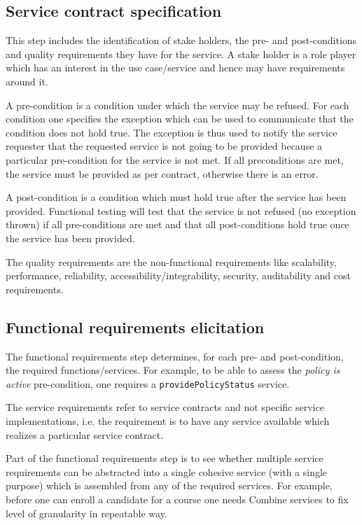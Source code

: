 \subsection{Service contract specification}
This step includes the identification of stake holders, the pre- and post-conditions and quality requirements they have for the service. A stake holder is a role player which has an interest in the use case/service and hence may have requirements around it. 

A pre-condition is a condition under which the service may be refused. For each condition one specifies the exception which can be used to communicate that the condition does not hold true. The exception is thus used to notify the service requester that the requested service is not going to be provided because a particular pre-condition for the service is not met. If all preconditions are met, the service must be provided as per contract, otherwise there is an error. 

A post-condition is a condition which must hold true after the service has been provided. Functional testing will test that the service is not refused (no exception thrown) if all pre-conditions are met and that all post-conditions hold true once the service has been provided.

The quality requirements are the non-functional requirements like scalability, performance, reliability, accessibility/integrability, security, auditability and cost requirements. 

\subsection{Functional requirements elicitation}
The functional requirements step determines, for each pre- and post-condition, the required functions/services. For example, to be able to assess the {\em policy is active} pre-condition, one requires a \verb+providePolicyStatus+ service. 

The service requirements refer to service contracts and not specific service implementations, i.e. the requirement is to have any service available which realizes a particular service contract.

Part of the functional requirements step is to see whether multiple service requirements can be abstracted into a single cohesive service (with a single purpose) which is assembled from any of the required services. For example, before one can enroll a candidate for a course one needs Combine services to fix level of granularity in repeatable way.

